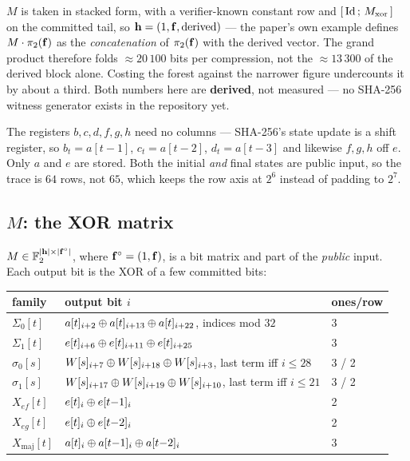 \begin{warning}
\label{warn:hsize}
$M$ is taken in stacked form, with a verifier-known constant row and
$[\,\mathrm{Id}\,;\,M_{\rm xor}\,]$ on the committed tail, so
$\mathbf{h}=(1,\mathbf{f},\text{derived})$ --- the paper's own example defines
$M\cdot\pi_2(\mathbf{f})$ as the \emph{concatenation} of $\pi_2(\mathbf{f})$ with the
derived vector. The grand product therefore folds
$\approx20\,100$ bits per compression, not the $\approx13\,300$ of the derived
block alone. Costing the forest against the narrower figure undercounts it by
about a third. Both numbers here are \textbf{derived}, not measured --- no
SHA-256 witness generator exists in the repository yet.
\end{warning}

The registers $b,c,d,f,g,h$ need no columns --- SHA-256's state update is a shift
register, so $b_t=a[t{-}1]$, $c_t=a[t{-}2]$, $d_t=a[t{-}3]$ and likewise
$f,g,h$ off $e$. Only $a$ and $e$ are stored. Both the initial \emph{and} final
states are public input, so the trace is $64$ rows, not $65$, which keeps the
row axis at $2^6$ instead of padding to $2^7$.

\subsection{$M$: the XOR matrix}

$M\in\mathbb{F}_2^{|\mathbf{h}|\times|\mathbf{f}^{\circ}|}$, where
$\mathbf{f}^{\circ}=(1,\mathbf{f})$, is a bit matrix and part of the \emph{public}
input. Each output bit is the XOR of a few committed bits:

\begin{center}\small
\begin{tabular}{@{}lll@{}}
\toprule
family & output bit $i$ & ones/row\\
\midrule
$\Sigma_0[t]$ & $a[t]_{i+2}\oplus a[t]_{i+13}\oplus a[t]_{i+22}$, indices mod $32$ & 3\\
$\Sigma_1[t]$ & $e[t]_{i+6}\oplus e[t]_{i+11}\oplus e[t]_{i+25}$ & 3\\
$\sigma_0[s]$ & $W[s]_{i+7}\oplus W[s]_{i+18}\oplus W[s]_{i+3}$, last term iff $i\leq28$ & 3 / 2\\
$\sigma_1[s]$ & $W[s]_{i+17}\oplus W[s]_{i+19}\oplus W[s]_{i+10}$, last term iff $i\leq21$ & 3 / 2\\
$X_{ef}[t]$ & $e[t]_i \oplus e[t{-}1]_i$ & 2\\
$X_{eg}[t]$ & $e[t]_i \oplus e[t{-}2]_i$ & 2\\
$X_{\mathrm{maj}}[t]$ & $a[t]_i \oplus a[t{-}1]_i \oplus a[t{-}2]_i$ & 3\\
\bottomrule
\end{tabular}
\end{center}


